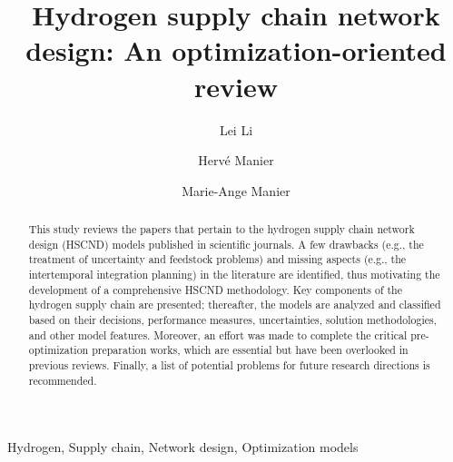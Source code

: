 \documentclass[11pt,3p]{elsarticle}
\begin{document}
\begin{frontmatter}

\title{Hydrogen supply chain network design: An optimization-oriented review}

\author[mymainaddress]{Lei Li}

\author[mymainaddress]{Herv\'{e} Manier}

\author[mymainaddress]{Marie-Ange Manier} 

\address[mymainaddress]{Univ. Bourgogne Franche-Comt\'{e} FEMTO-ST Institute/CNRS,\\ UTBM, rue Thierry-Mieg, 90 010 Belfort Cedex, France}

\begin{abstract}

This study reviews the papers that pertain to the hydrogen supply chain network design (HSCND) models published in scientific journals. A few drawbacks (e.g., the treatment of uncertainty and feedstock problems) and missing aspects (e.g., the intertemporal integration planning) in the literature are identified, thus motivating the development of a comprehensive HSCND methodology. Key components of the hydrogen supply chain are presented; thereafter, the models are analyzed and classified based on their decisions, performance measures, uncertainties, solution methodologies, and other model features. Moreover, an effort was made to complete the critical pre-optimization preparation works, which are essential but have been overlooked in previous reviews. Finally, a list of potential problems for future research directions is recommended.

\end{abstract}

\begin{keyword}
Hydrogen, Supply chain, Network design, Optimization models
\end{keyword}


\end{frontmatter}
\end{document}
